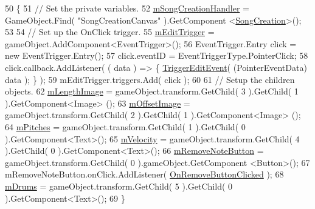 \begin{DoxyCode}
50         \{
51             \textcolor{comment}{// Set the private variables.}
52             \hyperlink{class_song_creation_1_1_note_display_panel_ab11cc1ad87541ada65b36e010d9c56c3}{mSongCreationHandler} = GameObject.Find( \textcolor{stringliteral}{"SongCreationCanvas"} ).GetComponent
      <\hyperlink{class_song_creation}{SongCreation}>();
53 
54             \textcolor{comment}{// Set up the OnClick trigger.}
55             \hyperlink{class_song_creation_1_1_note_display_panel_af2efb7939acf869e9a4e18ea31baa4e2}{mEditTrigger} = gameObject.AddComponent<EventTrigger>();
56             EventTrigger.Entry click = \textcolor{keyword}{new} EventTrigger.Entry();
57             click.eventID = EventTriggerType.PointerClick;
58             click.callback.AddListener( ( data ) => \{ \hyperlink{class_song_creation_1_1_note_display_panel_a56b230f3141d57f1c11dd342b352eaa3}{TriggerEditEvent}( (PointerEventData)
      data ); \} );
59             mEditTrigger.triggers.Add( click );
60 
61             \textcolor{comment}{// Setup the children objects.}
62             \hyperlink{class_song_creation_1_1_note_display_panel_a88560efe222dafc26795c508bcf5b5a2}{mLengthImage} = gameObject.transform.GetChild( 3 ).GetChild( 1 ).GetComponent<Image>
      ();
63             \hyperlink{class_song_creation_1_1_note_display_panel_a9a63fa0205fec1d90c093ad4174aed00}{mOffsetImage} = gameObject.transform.GetChild( 2 ).GetChild( 1 ).GetComponent<Image>
      ();
64             \hyperlink{class_song_creation_1_1_note_display_panel_a1bab51528899c56a7944e7d19ec3d8bb}{mPitches} = gameObject.transform.GetChild( 1 ).GetChild( 0 ).GetComponent<Text>();
65             \hyperlink{class_song_creation_1_1_note_display_panel_a3e9bb032c809e27c4ce277c532e4ff66}{mVelocity} = gameObject.transform.GetChild( 4 ).GetChild( 0 ).GetComponent<Text>();
66             \hyperlink{class_song_creation_1_1_note_display_panel_a3e533974552d5c029c1de67b6bd1c2da}{mRemoveNoteButton} = gameObject.transform.GetChild( 0 ).gameObject.GetComponent
      <Button>();
67             mRemoveNoteButton.onClick.AddListener( \hyperlink{class_song_creation_1_1_note_display_panel_a496b2c412d05d2816dd733eeef4caa61}{OnRemoveButtonClicked} );
68             \hyperlink{class_song_creation_1_1_note_display_panel_a7a6d14026ca347c32b2842d5c9dc54e9}{mDrums} = gameObject.transform.GetChild( 5 ).GetChild( 0 ).GetComponent<Text>();
69         \}
\end{DoxyCode}
\mbox{\label{class_song_creation_1_1_note_display_panel_aa53de786e5bd8e0d7b00ad1142cdf9df}} 
